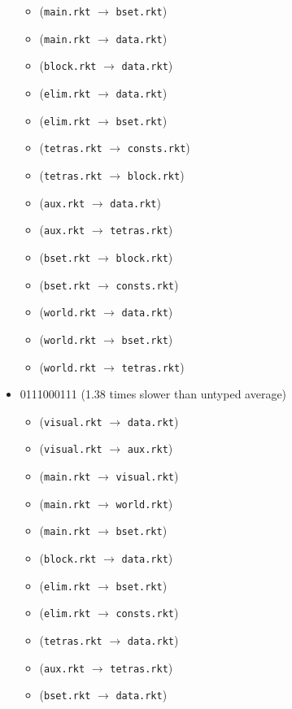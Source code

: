 \documentclass{article}
\newcommand{\mono}[1]{\texttt{#1}}
\begin{document}
\begin{itemize}
\begin{itemize}
  \item (\mono{main.rkt} $\rightarrow$ \mono{bset.rkt})
  \item (\mono{main.rkt} $\rightarrow$ \mono{data.rkt})
  \item (\mono{block.rkt} $\rightarrow$ \mono{data.rkt})
  \item (\mono{elim.rkt} $\rightarrow$ \mono{data.rkt})
  \item (\mono{elim.rkt} $\rightarrow$ \mono{bset.rkt})
  \item (\mono{tetras.rkt} $\rightarrow$ \mono{consts.rkt})
  \item (\mono{tetras.rkt} $\rightarrow$ \mono{block.rkt})
  \item (\mono{aux.rkt} $\rightarrow$ \mono{data.rkt})
  \item (\mono{aux.rkt} $\rightarrow$ \mono{tetras.rkt})
  \item (\mono{bset.rkt} $\rightarrow$ \mono{block.rkt})
  \item (\mono{bset.rkt} $\rightarrow$ \mono{consts.rkt})
  \item (\mono{world.rkt} $\rightarrow$ \mono{data.rkt})
  \item (\mono{world.rkt} $\rightarrow$ \mono{bset.rkt})
  \item (\mono{world.rkt} $\rightarrow$ \mono{tetras.rkt})
  \end{itemize}
\item 0111000111 (1.38 times slower than untyped average)
  \begin{itemize}
  \item (\mono{visual.rkt} $\rightarrow$ \mono{data.rkt})
  \item (\mono{visual.rkt} $\rightarrow$ \mono{aux.rkt})
  \item (\mono{main.rkt} $\rightarrow$ \mono{visual.rkt})
  \item (\mono{main.rkt} $\rightarrow$ \mono{world.rkt})
  \item (\mono{main.rkt} $\rightarrow$ \mono{bset.rkt})
  \item (\mono{block.rkt} $\rightarrow$ \mono{data.rkt})
  \item (\mono{elim.rkt} $\rightarrow$ \mono{bset.rkt})
  \item (\mono{elim.rkt} $\rightarrow$ \mono{consts.rkt})
  \item (\mono{tetras.rkt} $\rightarrow$ \mono{data.rkt})
  \item (\mono{aux.rkt} $\rightarrow$ \mono{tetras.rkt})
  \item (\mono{bset.rkt} $\rightarrow$ \mono{data.rkt})

\end{itemize}
\end{itemize}
\end{document}
